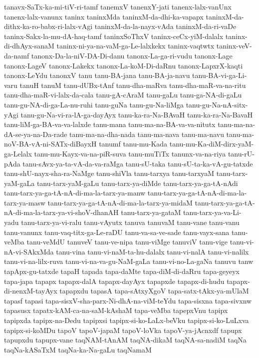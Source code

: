 {tanavx-SaTx-ka-mi-tiV-ri-tamf
tanemxV
tanenxY-jati
tanenx-lalx-vanUnx
tanenx-lalx-vanunx
taninx
taninxMda
taninxM-da-dhi-ka-vapapx
taninxM-da-dithx-ka-ro-babx-ri-lalx-vAgi
taninxM-da-la-nayx-vAda
taninxM-da-ri-vaDe
taninx-Sakx-la-mu-dA-haq-tamf
taninxSoThxV
taninx-ceCx-yiM-dalalx
taninx-di-dhAyx-sanaM
taninx-ni-ya-na-vaM-ga-Le-lalxkekx
taninx-vaqtwtx
taninx-veV-da-namf
tanonx-Da-la-niV-DA-Di-danu
tanonx-La-ga-ri-vudu
tanonx-Lage
tanonx-LageV
tanonx-Lakekx
tanonx-La-koM-Di-daRnu
tanonx-LapxrX-kaqti
tanonx-LeYdu
tanonxV
tanu
tanu-BA-jana
tanu-BA-ja-navu
tanu-BA-vi-ga-Li-varu
tanuH
tanuM
tanu-dUBx-tAnf
tanu-dha-maRva
tanu-dha-maR-va-na-ritu
tanu-dha-maR-vi-lalx-da-cala
tanu-gA-cAraM
tanu-gaLu
tanu-ga-NA-di-gaLu
tanu-gu-NA-di-ga-La-nu-ruhi
tanu-guNa
tanu-gu-Na-liMga
tanu-gu-Na-nA-sitx-yAgi
tanu-gu-Na-vi-ra-lA-ga-dayAyx
tanu-ka-ra-Na-BAvaH
tanu-ka-ra-Na-BavaH
tanu-liM-ga-BA-va-va-lalxde
tanu-mana
tanu-ma-na-BA-va-va-nitutx
tanu-ma-na-dA-se-ya-na-Da-rade
tanu-ma-na-dha-nada
tanu-ma-nava
tanu-ma-navu
tanu-ma-noV-BA-vA-ni-SATx-diBayxH
tanumf
tanu-mu-Kada
tanu-mu-Ka-diM-dirx-yaM-ga-Lelalx
tanu-mu-Kayx-va-na-piR-suva
tanu-muTiTx
tanunx-va-na-riya
tanu-rU-pAda
tanu-sAvx-ya-ta-vA-da-va-raMga
tanu-sU-taka
tanu-sU-ta-ka-vA-gu-tatxde
tanu-shU-nayx-sha-ra-NaMge
tanu-shiVla
tanu-tarxya
tanu-tarxyaM
tanu-tarx-yaM-gaLa
tanu-tarx-yaM-gaLu
tanu-tarx-ya-diMde
tanu-tarx-ya-ga-tA-nAdi
tanu-tarx-ya-ga-tA-nA-di-ma-la-tarx-ya-manw
tanu-tarx-ya-ga-tA-nA-di-ma-la-tarx-ya-masw
tanu-tarx-ya-ga-tA-nA-di-ma-la-tarx-ya-midaM
tanu-tarx-ya-ga-tA-nA-di-ma-la-tarx-ya-vi-shoV-dhanAH
tanu-tarx-ya-gataM
tanu-tarx-ya-va-Li-yadu
tanu-tarx-ya-vi-ralu
tanu-vAyutx
tanuva
tanuvaM
tanu-vane
tanu-vanu
tanu-vanunx
tanu-vaq-titx-ga-Le-raDU
tanu-va-sa-ve-sade
tanu-vayx-sana
tanu-veMba
tanu-veMdU
tanuveV
tanu-ve-nipa
tanu-viMge
tanuviV
tanu-vige
tanu-vi-nA-vi-SAkxMda
tanu-vina
tanu-vi-naM-ta-hu-dalalx
tanu-vi-nalA
tanu-vi-nalilx
tanu-vi-na-lilx-ruva
tanu-vi-na-va-gu-NaM-gaLa
tanu-vi-no-La-gaNa
tanuvu
tanw
tapApx-gu-tatxde
tapaH
tapada
tapa-daMte
tapa-diM-di-daRru
tapa-geyeyx
tapa-japa
tapapx
tapapx-dalA
tapapx-dayAyx
tapapxde
tapapx-di-hudu
tapapx-di-nenxM-tayAyx
tapapxdu
tapasA
tapa-sAtxyXgoV
tapa-satx-tAkx-ya-mUlaM
tapasf
tapasi
tapa-sisxV-sha-parx-Ni-dhA-na-viM-teYdu
tapa-sisxna
tapa-sivxnw
tapasusx
tapatx-kAM-ca-na-saM-kAshaM
tapa-veMba
tapepxVnu
tapipx
tapipxda
tapipx-na-Dedu
tapipxsi
tapipx-si-ko-LaLx-beVku
tapipx-si-ko-LuLxva
tapipx-si-koMDu
tapoV
tapoV-japaM
tapoV-loVka
tapoV-ya-jAcnxdf
tapupx
tapupxdu
tapupx-vane
taqNAM-tAnAM
taqNA-dikaM
taqNA-sa-nadiM
taqNa
taqNa-kASaTxM
taqNa-ka-Na-gaLu
taqNamaM
}
